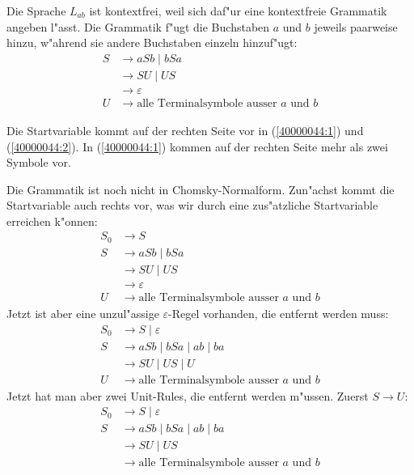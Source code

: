 \begin{loesung}
\begin{teilaufgaben}
\item
Die Sprache $L_{ab}$ ist kontextfrei, weil sich daf"ur eine kontextfreie
Grammatik angeben l"asst.
Die Grammatik f"ugt die Buchstaben $a$ und $b$ jeweils paarweise
hinzu, w"ahrend sie andere Buchstaben einzeln hinzuf"ugt:
\begin{align}
S&\rightarrow aSb\;|\; bSa \label{40000044:1}\\
 &\rightarrow SU \;|\; US  \label{40000044:2}\\
 &\rightarrow \varepsilon  \label{40000044:3}\\
U&\rightarrow \text{alle Terminalsymbole ausser $a$ und $b$} \label{40000044:4}
\end{align}
\item
Die Startvariable kommt auf der rechten Seite vor in (\ref{40000044:1})
und (\ref{40000044:2}).
In (\ref{40000044:1}) kommen auf der rechten Seite mehr als zwei Symbole vor.
\item
Die Grammatik ist noch nicht in Chomsky-Normalform.
Zun"achst kommt die Startvariable auch rechts vor, was wir durch eine
zus"atzliche Startvariable erreichen k"onnen:
\begin{align*}
S_0&\rightarrow S\\
S  &\rightarrow aSb\;|\; bSa\\
   &\rightarrow SU \;|\; US\\
   &\rightarrow \varepsilon\\
U  &\rightarrow \text{alle Terminalsymbole ausser $a$ und $b$}
\end{align*}
Jetzt ist aber eine unzul"assige $\varepsilon$-Regel vorhanden, die entfernt
werden muss:
\begin{align*}
S_0&\rightarrow S\;|\;\varepsilon\\
S  &\rightarrow aSb\;|\; bSa\;|\;ab\;|\;ba\\
   &\rightarrow SU \;|\; US\;|\;U\;\\
U  &\rightarrow \text{alle Terminalsymbole ausser $a$ und $b$}
\end{align*}
Jetzt hat man aber zwei Unit-Rules, die entfernt werden m"ussen.
Zuerst $S\rightarrow U$:
\begin{align*}
S_0&\rightarrow S\;|\;\varepsilon\\
S  &\rightarrow aSb\;|\; bSa\;|\;ab\;|\;ba\\
   &\rightarrow SU \;|\; US\\
   &\rightarrow \text{alle Terminalsymbole ausser $a$ und $b$}\\

\end{align*}
\end{teilaufgaben}
\end{loesung}
